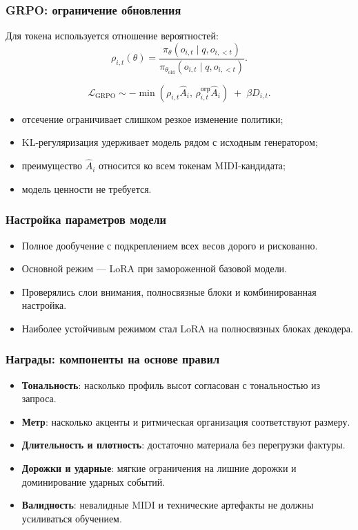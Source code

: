 \documentclass[aspectratio=169]{beamer}
\begin{document}
\begin{frame}
\frametitle{GRPO: ограничение обновления}
\small
Для токена используется отношение вероятностей:
\[
\rho_{i,t}(\theta)=
\frac{\pi_\theta(o_{i,t}\mid q,o_{i,<t})}
{\pi_{\theta_{\mathrm{old}}}(o_{i,t}\mid q,o_{i,<t})}.
\]

\[
\mathcal{L}_{\mathrm{GRPO}}
\sim
-\min\left(
\rho_{i,t}\hat{A}_i,\,
\rho^{\text{огр}}_{i,t}\hat{A}_i
\right)
\;+\;\beta D_{i,t}.
\]

\begin{itemize}
    \item отсечение ограничивает слишком резкое изменение политики;
    \item KL-регуляризация удерживает модель рядом с исходным генератором;
    \item преимущество $\hat{A}_i$ относится ко всем токенам MIDI-кандидата;
    \item модель ценности не требуется.
\end{itemize}
\end{frame}

\begin{frame}
\frametitle{Настройка параметров модели}
\begin{itemize}
    \item Полное дообучение с подкреплением всех весов дорого и рискованно.
    \item Основной режим --- LoRA при замороженной базовой модели.
    \item Проверялись слои внимания, полносвязные блоки и комбинированная настройка.
    \item Наиболее устойчивым режимом стал LoRA на полносвязных блоках декодера.
\end{itemize}
\end{frame}

\begin{frame}
\frametitle{Награды: компоненты на основе правил}
\begin{itemize}
    \item \textbf{Тональность}: насколько профиль высот согласован с тональностью из запроса.
    \item \textbf{Метр}: насколько акценты и ритмическая организация соответствуют размеру.
    \item \textbf{Длительность и плотность}: достаточно материала без перегрузки фактуры.
    \item \textbf{Дорожки и ударные}: мягкие ограничения на лишние дорожки и доминирование ударных событий.
    \item \textbf{Валидность}: невалидные MIDI и технические артефакты не должны усиливаться обучением.
\end{itemize}
\end{frame}
\end{document}
